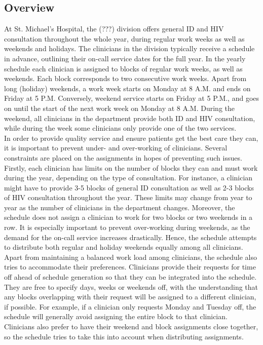 \subsection{Overview}
At St. Michael's Hospital, the (???) division offers general ID and HIV consultation throughout the whole year, during regular work weeks as well as weekends and holidays. The clinicians in the division typically receive a schedule in advance, outlining their on-call service dates for the full year. In the yearly schedule each clinician is assigned to blocks of regular work weeks, as well as weekends. Each block corresponds to two consecutive work weeks. Apart from long (holiday) weekends, a work week starts on Monday at 8 A.M. and ends on Friday at 5 P.M. Conversely, weekend service starts on Friday at 5 P.M., and goes on until the start of the next work week on Monday at 8 A.M. During the weekend, all clinicians in the department provide both ID and HIV consultation, while during the week some clinicians only provide one of the two services. \\

In order to provide quality service and ensure patients get the best care they can, it is important to prevent under- and over-working of clinicians. Several constraints are placed on the assignments in hopes of preventing such issues. Firstly, each clinician has limits on the number of blocks they can and must work during the year, depending on the type of consultation. For instance, a clinician might have to provide 3-5 blocks of general ID consultation as well as 2-3 blocks of HIV consultation throughout the year. These limits may change from year to year as the number of clinicians in the department changes. Moreover, the schedule does not assign a clinician to work for two blocks or two weekends in a row. It is especially important to prevent over-working during weekends, as the demand for the on-call service increases drastically. Hence, the schedule attempts to distribute both regular and holiday weekends equally among all clinicians. \\

Apart from maintaining a balanced work load among clinicians, the schedule also tries to accommodate their preferences. Clinicians provide their requests for time off ahead of schedule generation so that they can be integrated into the schedule. They are free to specify days, weeks or weekends off, with the understanding that any blocks overlapping with their request will be assigned to a different clinician, if possible. For example, if a clinician only requests Monday and Tuesday off, the schedule will generally avoid assigning the entire block to that clinician. Clinicians also prefer to have their weekend and block assignments close together, so the schedule tries to take this into account when distributing assignments. \\

